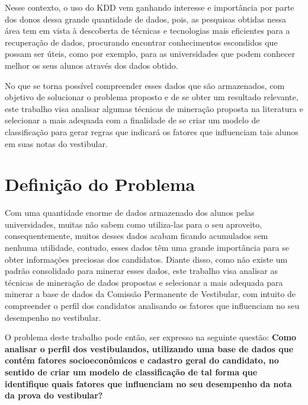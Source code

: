 \par
Nesse contexto, o uso do KDD vem ganhando interesse e importância por parte dos donos dessa grande quantidade de dados, pois, as pesquisas obtidas nessa área tem em vista à descoberta de técnicas e tecnologias mais eficientes para a recuperação de dados, procurando encontrar conhecimentos escondidos que possam ser úteis, como por exemplo, para as universidades que podem conhecer melhor os seus alunos através dos dados obtido.

No que se torna possível compreender esses dados que são armazenados, com objetivo de solucionar o problema proposto e de se obter um resultado relevante, este trabalho visa analisar algumas técnicas de mineração proposta na literatura e selecionar a mais adequada com a finalidade de se criar um modelo de classificação para gerar regras que indicará os fatores que influenciam tais alunos em suas notas do vestibular.


\section{Definição do Problema}

\par
Com uma quantidade enorme de dados armazenado dos alunos pelas universidades, muitas não sabem como utiliza-las para o seu aproveito, consequentemente, muitos desses dados acabam ficando acumulados sem nenhuma utilidade, contudo, esses dados têm uma grande importância para se obter informações preciosas dos candidatos. Diante disso, como não existe um padrão consolidado para minerar esses dados, este trabalho visa analisar as técnicas de mineração de dados propostas e selecionar a mais adequada para minerar a base de dados da Comissão Permanente de Vestibular, com intuito de compreender o perfil dos candidatos analisando os fatores que influenciam no seu desempenho no vestibular.

\par
O problema deste trabalho pode então, ser expresso na seguinte questão: \textbf{Como analisar o perfil dos vestibulandos, utilizando uma base de dados que contém fatores socioeconômicos e cadastro geral do candidato, no sentido de criar um modelo de classificação de tal forma que identifique quais fatores que influenciam no seu desempenho da nota  da prova do vestibular? }



